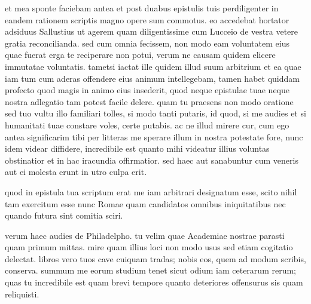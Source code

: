 


 et mea sponte faciebam antea et post duabus epistulis tuis perdiligenter in eandem rationem scriptis magno opere sum commotus. eo accedebat hortator adsiduus Sallustius ut agerem quam diligentissime cum Lucceio de vestra vetere gratia reconcilianda. sed cum omnia fecissem, non modo eam voluntatem eius quae fuerat erga te reciperare non potui, verum ne causam quidem elicere immutatae voluntatis. tametsi iactat ille quidem illud suum arbitrium et ea quae iam tum cum aderas offendere eius animum intellegebam, tamen habet quiddam profecto quod magis in animo eius insederit, quod neque epistulae tuae neque nostra adlegatio tam potest facile delere. quam tu praesens non modo oratione sed tuo vultu illo familiari tolles, si modo tanti putaris, id quod, si me audies et si humanitati tuae constare voles, certe putabis. ac ne illud mirere cur, cum ego antea significarim tibi per litteras me sperare illum in nostra potestate fore, nunc idem videar diffidere, incredibile est quanto mihi videatur illius voluntas obstinatior et in hac iracundia offirmatior. sed haec aut sanabuntur cum veneris aut ei molesta erunt in utro culpa erit.

 quod in epistula tua scriptum erat me iam arbitrari designatum esse, scito nihil tam exercitum esse nunc Romae quam candidatos omnibus iniquitatibus nec quando futura sint comitia sciri.

 verum haec audies de Philadelpho. tu velim quae Academiae nostrae parasti quam primum mittas. mire quam illius loci non modo usus sed etiam cogitatio delectat. libros vero tuos cave cuiquam tradas; nobis eos, quem ad modum scribis, conserva. summum me eorum studium tenet sicut odium iam ceterarum rerum; quas tu incredibile est quam brevi tempore quanto deteriores offensurus sis quam reliquisti.
